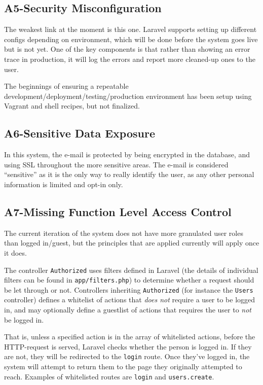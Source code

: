 \subsection{A5-Security Misconfiguration}

The weakest link at the moment is this one. Laravel supports setting up
different configs depending on environment, which will be done before
the system goes live but is not yet. One of the key components is that
rather than showing an error trace in production, it will log the errors
and report more cleaned-up ones to the user.

The beginnings of ensuring a repeatable
development/deployment/testing/production environment has been setup
using Vagrant and shell recipes, but not finalized.

\subsection{A6-Sensitive Data Exposure}

In this system, the e-mail is protected by being encrypted in the
database, and using SSL throughout the more sensitive areas. The e-mail
is considered ``sensitive'' as it is the only way to really identify the
user, as any other personal information is limited and opt-in only.

\subsection{A7-Missing Function Level Access Control}

The current iteration of the system does not have more granulated user
roles than logged in/guest, but the principles that are applied
currently will apply once it does.

The controller \texttt{Authorized} uses filters defined in Laravel (the
details of individual filters can be found in \texttt{app/filters.php})
to determine whether a request should be let through or not. Controllers
inheriting \texttt{Authorized} (for instance the \texttt{Users}
controller) defines a whitelist of actions that \emph{does not} require
a user to be logged in, and may optionally define a guestlist of actions
that requires the user to \emph{not} be logged in.

That is, unless a specified action is in the array of whitelisted
actions, before the HTTP-request is served, Laravel checks whether the
person is logged in. If they are not, they will be redirected to the
\texttt{login} route. Once they've logged in, the system will attempt to
return them to the page they originally attempted to reach. Examples of
whitelisted routes are \texttt{login} and \texttt{users.create}.


